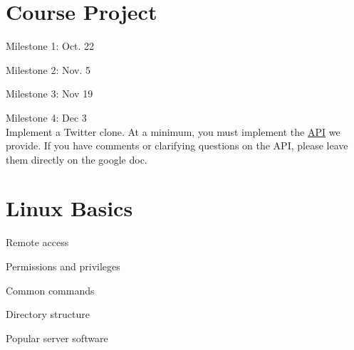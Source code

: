 \documentclass[fancy,11pt,titlestyle=display]{style/elegantbook}
\begin{document}
\chapter{Course Project}

\begin{problemset}
\item Milestone 1: Oct. 22
\item Milestone 2: Nov. 5
\item Milestone 3: Nov 19
\item Milestone 4: Dec 3\\
Implement a Twitter clone. At a minimum, you must implement the \href{https://docs.google.com/document/d/1ycOO0sVB2TJOmIdwL6ow96pQj3k4-r7ptPsT93BInQ4/edit?usp=sharing}{\underline{API}} we provide. If you have comments or clarifying questions on the API, please leave them directly on the google doc.\\
\end{problemset}
\clearpage

\appendix



\chapter{Linux Basics}

\begin{introduction}[Topics]
\item Remote access
\item Permissions and privileges
\item Common commands
\item Directory structure
\item Popular server software
\end{introduction}
\end{document}
